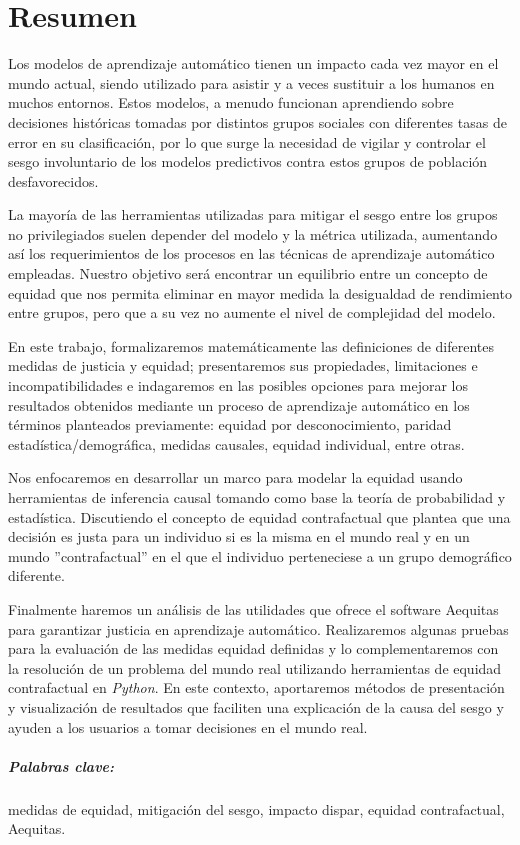 \chapter*{Resumen}


Los modelos de aprendizaje automático tienen un impacto cada vez mayor en el mundo actual, siendo utilizado para asistir y a veces sustituir a los humanos en muchos entornos. Estos modelos, a menudo funcionan aprendiendo sobre decisiones históricas tomadas por distintos grupos sociales con diferentes tasas de error en su clasificación, por lo que surge la necesidad de vigilar y controlar el sesgo involuntario de los modelos predictivos contra estos
grupos de población desfavorecidos.

La mayoría de las herramientas utilizadas para mitigar el sesgo entre los grupos no privilegiados suelen depender del modelo y la métrica utilizada, aumentando así los requerimientos de los procesos en las técnicas de aprendizaje automático empleadas. Nuestro objetivo será encontrar un equilibrio entre un concepto de equidad que nos permita eliminar en mayor medida la desigualdad de rendimiento entre grupos, pero que a su vez no aumente el nivel de complejidad del modelo.

En este trabajo, formalizaremos matemáticamente las definiciones de diferentes medidas de justicia y
equidad; presentaremos sus propiedades, limitaciones e incompatibilidades e indagaremos en las posibles opciones
para mejorar los resultados obtenidos mediante un proceso de aprendizaje automático en los
términos planteados previamente:
equidad por desconocimiento, paridad estadística/demográfica, medidas causales, equidad individual, entre otras.

Nos enfocaremos en desarrollar un marco para modelar la equidad usando herramientas de inferencia causal tomando como base la teoría de probabilidad y estadística. Discutiendo el concepto de equidad contrafactual que plantea que una decisión es justa para un individuo si es la misma en el mundo real y en un
mundo ''contrafactual'' en el que el individuo perteneciese a un grupo demográfico
diferente. 

Finalmente haremos un análisis de las utilidades que ofrece el software Aequitas para garantizar justicia en aprendizaje automático. Realizaremos algunas pruebas para la evaluación de las medidas equidad definidas y lo complementaremos con la resolución de un problema del mundo real utilizando herramientas de equidad contrafactual en \textit{Python}. En este contexto, aportaremos métodos de presentación y visualización de resultados que faciliten una explicación de la causa del sesgo y ayuden a los usuarios a tomar decisiones en el mundo real.

\paragraph{Palabras clave:} medidas de equidad, mitigación del sesgo, impacto dispar, equidad contrafactual, Aequitas.